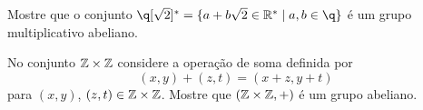 \documentclass[12pt]{article}
\begin{document}
\vesp

\questao Mostre que o conjunto $\q[\sqrt{2}]^*=\{ a + b\sqrt{2} \in
\mathbb{R}^* \mid  a, b \in \q \}$ {\'e} um grupo multiplicativo abeliano.

\vesp

\questao No conjunto $\mathbb{Z} \times \mathbb{Z}$ considere a opera\c{c}\~ao de soma definida por
\[
	(x, y) + (z, t) = (x + z, y + t)
\]
para $(x, y)$, $(z, t) \in \mathbb{Z} \times \mathbb{Z}$. Mostre que $(\mathbb{Z}\times\mathbb{Z}, +)$ \'e um grupo abeliano.






\end{document}
